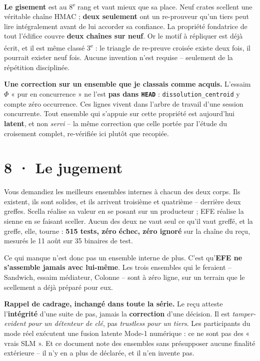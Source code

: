 \documentclass[10pt]{article}
\newcommand{\code}[1]{\texttt{\small #1}}
\begin{document}
\textbf{Le gisement} est au 8\textsuperscript{e} rang et vaut mieux que sa place. Neuf crates scellent
une véritable chaîne HMAC ; \textbf{deux seulement} ont un re-prouveur qu'un tiers peut lire
intégralement avant de lui accorder sa confiance. La propriété fondatrice de tout l'édifice couvre
\textbf{deux chaînes sur neuf}. Or le motif à répliquer est déjà écrit, et il est même classé
3\textsuperscript{e} : le triangle de re-preuve croisée existe deux fois, il pourrait exister neuf fois.
Aucune invention n'est requise -- seulement de la répétition disciplinée.

\begin{alerte}
\textbf{Une correction sur un ensemble que je classais comme acquis.} L'essaim $\Phi$ « pur en
concurrence » ne l'est \textbf{pas dans \code{HEAD}} : \code{dissolution\_centroid} y compte zéro
occurrence. Ces lignes vivent dans l'arbre de travail d'une session concurrente. Tout ensemble qui
s'appuie sur cette propriété est aujourd'hui \textbf{latent}, et non \emph{servi} -- la même correction
que celle portée par l'étude du croisement complet, re-vérifiée ici plutôt que recopiée.
\end{alerte}

\section{8 · Le jugement}

Vous demandiez les meilleurs ensembles internes à chacun des deux corps. Ils existent, ils sont
solides, et ils arrivent troisième et quatrième -- derrière deux greffes. Scella réalise sa valeur en se
posant sur un producteur ; EFE réalise la sienne en se faisant sceller. Aucun des deux ne vaut seul ce
qu'il vaut greffé, et la greffe, elle, tourne : \textbf{515 tests, zéro échec, zéro ignoré} sur la
chaîne du reçu, mesurés le 11 août sur 35 binaires de test.

Ce qui manque n'est donc pas un ensemble interne de plus. C'est qu'\textbf{EFE ne s'assemble jamais
avec lui-même}. Les trois ensembles qui le feraient -- Sandwich, essaim médiateur, Colonne -- sont à
zéro ligne, sur un terrain que le scellement a déjà préparé pour eux.

\begin{these}
\small\textbf{Rappel de cadrage, inchangé dans toute la série.} Le reçu atteste l'\textbf{intégrité}
d'une suite de pas, jamais la \textbf{correction} d'une décision. Il est \emph{tamper-evident pour un
détenteur de clé}, pas \emph{trustless pour un tiers}. Les participants du mode réel exécutent une
fusion latente Mode-1 numérique : ce ne sont pas des « vrais SLM ». Et ce document note des ensembles
sans présupposer aucune finalité extérieure -- il n'y en a plus de déclarée, et il n'en invente pas.
\end{these}
\end{document}
